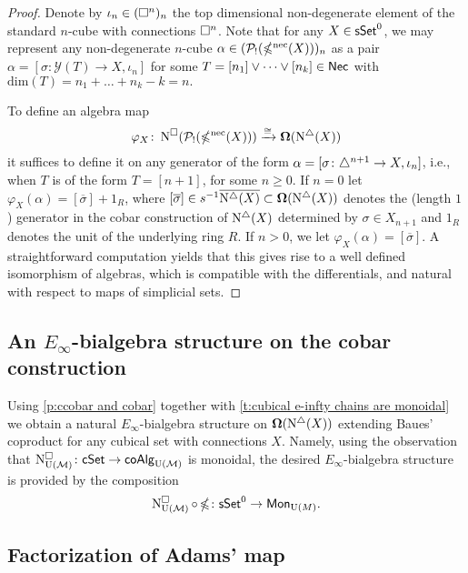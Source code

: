 \begin{proof} 
	Denote by $\iota_n \in (\square^n)_n$ the top dimensional non-degenerate element of the standard $n$-cube with connections $\square^n$.
	Note that for any $X \in \mathsf{sSet}^0$, we may represent any non-degenerate $n$-cube $\alpha \in (\mathcal{P}_!(\operatorname{\mathbb{\Omega}^{\mathrm{nec}}}(X)))_n$ as a pair $\alpha=[\sigma \colon \mathcal{Y}(T) \to X, \iota_n]$ for some $T=[n_1] \vee \dots \vee [n_k] \in \mathsf{Nec}$ with $\text{dim}(T)=n_1+ \dots+n_k-k=n.$
	
	To define an algebra map
	\begin{equation*}
	\varphi_X \colon \operatorname{N^{\square}}(\mathcal{P}_!(\operatorname{\mathbb{\Omega}^{\mathrm{nec}}}(X))) \xrightarrow{\cong} \mathbf{\Omega}(\operatorname{N^{\triangle}}(X))
	\end{equation*}
	it suffices to define it on any generator of the form $\alpha=[\sigma \colon \triangle^{n+1} \to X, \iota_{n}]$, i.e., when $T$ is of the form $T=[n+1]$, for some $n\geq0$.
	If $n=0$ let $\varphi_X(\alpha)= [\overline{\sigma}]+ 1_R$, where $[\overline{\sigma}] \in s^{-1} \overline{ \operatorname{N^{\triangle}}(X)} \subset \mathbf{\Omega}(\operatorname{N^{\triangle}}(X))$ denotes the (length $1$) generator in the cobar construction of $\operatorname{N^{\triangle}}(X)$ determined by $\sigma \in X_{n+1}$ and $1_R$ denotes the unit of the underlying ring $R$.
	If $n>0$, we let $\varphi_X(\alpha)=[\overline{\sigma}]$.
	A straightforward computation yields that this gives rise to a well defined isomorphism of algebras, which is compatible with the differentials, and natural with respect to maps of simplicial sets.
\end{proof}

\subsection{An $E_{\infty}$-bialgebra structure on the cobar construction} \label{ss:e-infty on cobar}

Using \cref{p:ccobar and cobar} together with \cref{t:cubical e-infty chains are monoidal} we obtain a natural $E_{\infty}$-bialgebra structure on $\operatorname{\mathbf{\Omega}}(\operatorname{N^{\triangle}}(X))$ extending Baues' coproduct for any cubical set with connections $X$.
Namely, using the observation that $\operatorname{N^{\square}_{{\operatorname{U}(\mathcal{M})}}} \colon \mathsf{cSet} \to \mathsf{coAlg}_{{\operatorname{U}(\mathcal{M})}}$ is monoidal, the desired $E_{\infty}$-bialgebra structure is provided by the composition 
$$\operatorname{N^{\square}_{{\operatorname{U}(\mathcal{M})}}} \circ \operatorname{\mathbb{\Omega}} \colon \mathsf{sSet}^0 \to \mathsf{Mon}_{\operatorname{U}(M)}.$$

\subsection{Factorization of Adams' map} \label{factorization}

